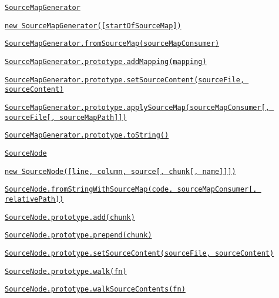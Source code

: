 \begin{DoxyItemize}
\begin{DoxyItemize}
\begin{DoxyItemize}
\end{DoxyItemize}
\item \href{#sourcemapgenerator}{\tt Source\+Map\+Generator}
\begin{DoxyItemize}
\item \href{#new-sourcemapgeneratorstartofsourcemap}{\tt new Source\+Map\+Generator(\mbox{[}start\+Of\+Source\+Map\mbox{]})}
\item \href{#sourcemapgeneratorfromsourcemapsourcemapconsumer}{\tt Source\+Map\+Generator.\+from\+Source\+Map(source\+Map\+Consumer)}
\item \href{#sourcemapgeneratorprototypeaddmappingmapping}{\tt Source\+Map\+Generator.\+prototype.\+add\+Mapping(mapping)}
\item \href{#sourcemapgeneratorprototypesetsourcecontentsourcefile-sourcecontent}{\tt Source\+Map\+Generator.\+prototype.\+set\+Source\+Content(source\+File, source\+Content)}
\item \href{#sourcemapgeneratorprototypeapplysourcemapsourcemapconsumer-sourcefile-sourcemappath}{\tt Source\+Map\+Generator.\+prototype.\+apply\+Source\+Map(source\+Map\+Consumer\mbox{[}, source\+File\mbox{[}, source\+Map\+Path\mbox{]}\mbox{]})}
\item \href{#sourcemapgeneratorprototypetostring}{\tt Source\+Map\+Generator.\+prototype.\+to\+String()}
\end{DoxyItemize}
\item \href{#sourcenode}{\tt Source\+Node}
\begin{DoxyItemize}
\item \href{#new-sourcenodeline-column-source-chunk-name}{\tt new Source\+Node(\mbox{[}line, column, source\mbox{[}, chunk\mbox{[}, name\mbox{]}\mbox{]}\mbox{]})}
\item \href{#sourcenodefromstringwithsourcemapcode-sourcemapconsumer-relativepath}{\tt Source\+Node.\+from\+String\+With\+Source\+Map(code, source\+Map\+Consumer\mbox{[}, relative\+Path\mbox{]})}
\item \href{#sourcenodeprototypeaddchunk}{\tt Source\+Node.\+prototype.\+add(chunk)}
\item \href{#sourcenodeprototypeprependchunk}{\tt Source\+Node.\+prototype.\+prepend(chunk)}
\item \href{#sourcenodeprototypesetsourcecontentsourcefile-sourcecontent}{\tt Source\+Node.\+prototype.\+set\+Source\+Content(source\+File, source\+Content)}
\item \href{#sourcenodeprototypewalkfn}{\tt Source\+Node.\+prototype.\+walk(fn)}
\item \href{#sourcenodeprototypewalksourcecontentsfn}{\tt Source\+Node.\+prototype.\+walk\+Source\+Contents(fn)}

\end{DoxyItemize}
\end{DoxyItemize}
\end{DoxyItemize}
